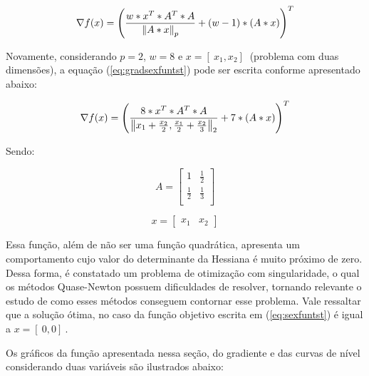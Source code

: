 \begin{equation}\label{eq:gradsexfuntst}
    \nabla f(x) = \left(\frac{w*x^T*A^T*A}{\left\lVert A*x\right\rVert_p}+(w-1)*(A*x)\right)^T
\end{equation}

Novamente, considerando $p=2$, $w=8$ e $x=[\ x_1 , x_2 ]\ $ (problema com duas dimensões), a equação (\ref{eq:gradsexfuntst}) pode ser escrita conforme apresentado abaixo:

\begin{equation}\label{eq:gradsexfuntst}
    \nabla f(x) = \left(\frac{8*x^T*A^T*A}{\left\lVert x_1 + \frac{x_2}{2},\frac{x_1}{2}+\frac{x_2}{3} \right\rVert_2}+7*(A*x)\right)^T
\end{equation}

Sendo:

\begin{equation*}
    A = \begin{bmatrix}
        1 & \frac{1}{2} \\
        \frac{1}{2} & \frac{1}{3} \\
    \end{bmatrix}
\end{equation*}

\begin{equation*}
    x = \begin{bmatrix}
        x_1 & x_2
    \end{bmatrix}
\end{equation*}

Essa função, além de não ser uma função quadrática, apresenta um comportamento cujo valor do determinante da Hessiana é muito próximo de zero. Dessa forma, é constatado um problema de otimização com singularidade, o qual os métodos Quase-Newton possuem dificuldades de resolver, tornando relevante o estudo de como esses métodos conseguem contornar esse problema. Vale ressaltar que a solução ótima, no caso da função objetivo escrita em (\ref{eq:sexfuntst}) é igual a $x=[\ 0 , 0 ]\ $. \par

Os gráficos da função apresentada nessa seção, do gradiente e das curvas de nível considerando duas variáveis são ilustrados abaixo:

